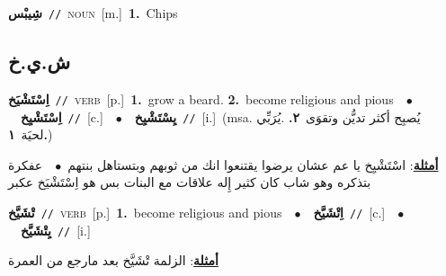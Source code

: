 \documentclass[10pt,a4paper,twoside]{article} %
\begin{document}
\begin{multicols}{2}
{\setlength\topsep{0pt}\textbf{\foreignlanguage{arabic}{شِيبْس}}\ {\color{gray}\texttt{//}\color{black}}\ \textsc{noun}\ [m.]\ \textbf{1.}~Chips\ } \vspace{2mm}

\vspace{-3mm}
\subsection*{\color{blue}\foreignlanguage{arabic}{ش.ي.خ}\color{blue}{}} 

{\setlength\topsep{0pt}\textbf{\foreignlanguage{arabic}{اِسْتَشْيَخ}}\ {\color{gray}\texttt{//}\color{black}}\ \textsc{verb}\ [p.]\ \textbf{1.}~grow a beard.  \textbf{2.}~become religious and pious\ \ $\bullet$\ \ \setlength\topsep{0pt}\textbf{\foreignlanguage{arabic}{اِسْتَشْيِخ}}\ {\color{gray}\texttt{//}\color{black}}\ [c.]\ \ $\bullet$\ \ \setlength\topsep{0pt}\textbf{\foreignlanguage{arabic}{يِسْتَشْيِخ}}\ {\color{gray}\texttt{//}\color{black}}\ [i.]\ \color{gray}(msa. \foreignlanguage{arabic}{يُصبِح أكثر تديُّن وتقوَى}~\foreignlanguage{arabic}{\textbf{٢.}}  .\foreignlanguage{arabic}{يُرَبِّي لحيَة}~\foreignlanguage{arabic}{\textbf{١.}})\color{black}\  \begin{flushright}\color{gray}\foreignlanguage{arabic}{\textbf{\underline{\foreignlanguage{arabic}{أمثلة}}}: اسْتَشْيِخ يا عم عشان يرضوا يقتنعوا انك من ثوبهم وبتستاهل بنتهم\ $\bullet$\ \  عفكرة بتذكره وهو شاب كان كثير إِله علاقات مع البنات بس هو اِسْتَشْيَخ عكبر}\end{flushright}\color{black}} \vspace{2mm}

{\setlength\topsep{0pt}\textbf{\foreignlanguage{arabic}{تْشَيَّخ}}\ {\color{gray}\texttt{//}\color{black}}\ \textsc{verb}\ [p.]\ \textbf{1.}~become religious and pious\ \ $\bullet$\ \ \setlength\topsep{0pt}\textbf{\foreignlanguage{arabic}{اِتْشَيَّخ}}\ {\color{gray}\texttt{//}\color{black}}\ [c.]\ \ $\bullet$\ \ \setlength\topsep{0pt}\textbf{\foreignlanguage{arabic}{يِتْشَيَّخ}}\ {\color{gray}\texttt{//}\color{black}}\ [i.]\  \begin{flushright}\color{gray}\foreignlanguage{arabic}{\textbf{\underline{\foreignlanguage{arabic}{أمثلة}}}: الزلمة تْشَيَّخ بعد مارجع من العمرة}\end{flushright}\color{black}} \vspace{2mm}


\end{multicols}
\end{document}
